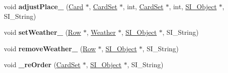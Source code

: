 \begin{DoxyCompactItemize}
\item 
\mbox{\label{class_field_aabc5eb64105cfea79573714c43d36efb}} 
void {\bfseries adjust\+Place\+\_\+} (\hyperlink{class_card}{Card} $\ast$, \hyperlink{class_card_set}{Card\+Set} $\ast$, int, \hyperlink{class_card_set}{Card\+Set} $\ast$, int, \hyperlink{class_s_i___object}{S\+I\+\_\+\+Object} $\ast$, S\+I\+\_\+\+String)
\item 
\mbox{\label{class_field_a0dbace96132045e1277520a54cb1b2ac}} 
void {\bfseries set\+Weather\+\_\+} (\hyperlink{class_card_set}{Row} $\ast$, \hyperlink{class_weather}{Weather} $\ast$, \hyperlink{class_s_i___object}{S\+I\+\_\+\+Object} $\ast$, S\+I\+\_\+\+String)
\item 
\mbox{\label{class_field_a407e40c1ceb1bec6b2cf0b575d174b84}} 
void {\bfseries remove\+Weather\+\_\+} (\hyperlink{class_card_set}{Row} $\ast$, \hyperlink{class_s_i___object}{S\+I\+\_\+\+Object} $\ast$, S\+I\+\_\+\+String)
\item 
\mbox{\label{class_field_a761307a0a60844e98157b31fc5c88654}} 
void {\bfseries \+\_\+re\+Order} (\hyperlink{class_card_set}{Card\+Set} $\ast$, \hyperlink{class_s_i___object}{S\+I\+\_\+\+Object} $\ast$, S\+I\+\_\+\+String)
\end{DoxyCompactItemize}
